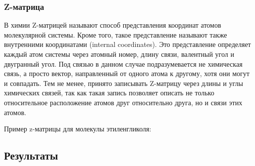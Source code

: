 \subsubsection{Z-матрица}
В химии Z-матрицей называют способ представления координат атомов молекулярной системы. Кроме того, такое представление называют также внутренними координатами (internal coordinates). Это представление определяет каждый атом системы через атомный номер, длину связи, валентный угол и двугранный угол. Под связью в данном случае подразумевается не химическая связь, а просто вектор, направленный от одного атома к другому, хотя они могут и совпадать. Тем не менее, принято записывать Z-матрицу через длины и углы химических связей, так как такая запись позволяет описать не только относительное расположение атомов друг относительно друга, но и связи этих атомов.

Пример z-матрицы для молекулы этиленгликоля:
\begin{table}[H]
\end{table}



\subsection{Результаты}
